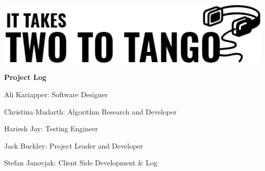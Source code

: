 \documentclass[12pt]{article}
\begin{document}
\begin{center}
\includegraphics[scale = 0.4]{logo.png}
\end{center}

\begin{center}
  {\large \textbf{Project Log}}\\
\end{center}


  \begin{indent}
 {\large Ali Kariapper: Software Designer}\\[1mm]
   \end{indent}
  \begin{indent}
  {\large Christina Mudarth: Algorithm Research and Developer}\\[1mm]
  \end{indent}
  \begin{indent}
 {\large Hariesh Jay: Testing Engineer}\\[1mm]
 \end{indent}
 \begin{indent}
  {\large Jack Buckley: Project Leader and Developer}\\[1mm]
  \end{indent}
  \begin{indent}
  {\large Stefan Janovjak: Client Side Development \& Log}\\[1mm]
  \end{indent}
  
\end{document}
